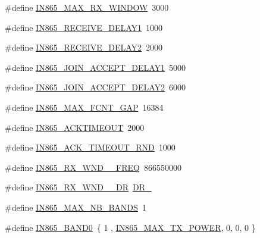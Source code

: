 \begin{DoxyCompactItemize}
\#define \mbox{\hyperlink{group___r_e_g_i_o_n_i_n865_gaf29bf6c8c2906dc70b8b795b7168523e}{I\+N865\+\_\+\+M\+A\+X\+\_\+\+R\+X\+\_\+\+W\+I\+N\+D\+OW}}~3000
\item 
\#define \mbox{\hyperlink{group___r_e_g_i_o_n_i_n865_ga7c1655393a8e012682387275d85f9db8}{I\+N865\+\_\+\+R\+E\+C\+E\+I\+V\+E\+\_\+\+D\+E\+L\+A\+Y1}}~1000
\item 
\#define \mbox{\hyperlink{group___r_e_g_i_o_n_i_n865_ga466f7d5de82107e42f3ceb0a312cb833}{I\+N865\+\_\+\+R\+E\+C\+E\+I\+V\+E\+\_\+\+D\+E\+L\+A\+Y2}}~2000
\item 
\#define \mbox{\hyperlink{group___r_e_g_i_o_n_i_n865_gaa1f6bf34fbc09d19267191ae009d9acc}{I\+N865\+\_\+\+J\+O\+I\+N\+\_\+\+A\+C\+C\+E\+P\+T\+\_\+\+D\+E\+L\+A\+Y1}}~5000
\item 
\#define \mbox{\hyperlink{group___r_e_g_i_o_n_i_n865_gaa3078b10a852a328bf425e8b5d5969d1}{I\+N865\+\_\+\+J\+O\+I\+N\+\_\+\+A\+C\+C\+E\+P\+T\+\_\+\+D\+E\+L\+A\+Y2}}~6000
\item 
\#define \mbox{\hyperlink{group___r_e_g_i_o_n_i_n865_ga8af1e01f501561a336d851c84dbd81b9}{I\+N865\+\_\+\+M\+A\+X\+\_\+\+F\+C\+N\+T\+\_\+\+G\+AP}}~16384
\item 
\#define \mbox{\hyperlink{group___r_e_g_i_o_n_i_n865_ga846d440d91293486df884023fe5a3449}{I\+N865\+\_\+\+A\+C\+K\+T\+I\+M\+E\+O\+UT}}~2000
\item 
\#define \mbox{\hyperlink{group___r_e_g_i_o_n_i_n865_ga271017fa88b513c5e7a46a56122f2f9e}{I\+N865\+\_\+\+A\+C\+K\+\_\+\+T\+I\+M\+E\+O\+U\+T\+\_\+\+R\+ND}}~1000
\item 
\#define \mbox{\hyperlink{group___r_e_g_i_o_n_i_n865_ga22d8f8d2c263922a14c5e41f41eea46a}{I\+N865\+\_\+\+R\+X\+\_\+\+W\+N\+D\+\_\+\_\+\+F\+R\+EQ}}~866550000
\item 
\#define \mbox{\hyperlink{group___r_e_g_i_o_n_i_n865_ga0ffc8ecfa8415acdb00901ffca1e2f1b}{I\+N865\+\_\+\+R\+X\+\_\+\+W\+N\+D\+\_\+\_\+\+DR}}~\mbox{\hyperlink{group___r_e_g_i_o_n_gad402daa928a8b3dea829315fab69de17}{D\+R\+\_}}
\item 
\#define \mbox{\hyperlink{group___r_e_g_i_o_n_i_n865_ga0cb9f2d2f0224a649a6e53522acb2ad6}{I\+N865\+\_\+\+M\+A\+X\+\_\+\+N\+B\+\_\+\+B\+A\+N\+DS}}~1
\item 
\#define \mbox{\hyperlink{group___r_e_g_i_o_n_i_n865_gafe17c0a123d728b699efa637aed2459d}{I\+N865\+\_\+\+B\+A\+N\+D0}}~\{ 1 , \mbox{\hyperlink{group___r_e_g_i_o_n_i_n865_ga6bd515d7c4fbad47210702da1d9396a3}{I\+N865\+\_\+\+M\+A\+X\+\_\+\+T\+X\+\_\+\+P\+O\+W\+ER}}, 0, 0, 0 \}
\item 

\end{DoxyCompactItemize}
